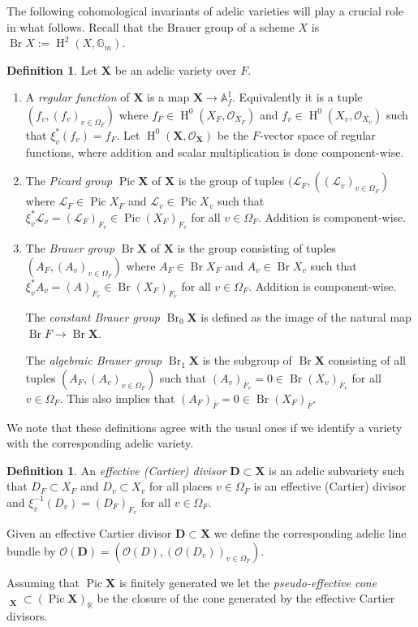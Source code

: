 \documentclass[a4paper,11pt,reqno]{amsart}
\newcommand{\R}{\mathbb{R}}
\newcommand{\G}{\mathbb{G}}
\newcommand{\A}{\mathbb{A}}
\DeclareMathOperator{\Pic}{Pic}
\DeclareMathOperator{\Eff}{\overline{Eff}}
\DeclareMathOperator{\Br}{Br}
\DeclareMathOperator{\HH}{H}
\theoremstyle{definition}
\newtheorem{definition}[theorem]{Definition}
\begin{document}
The following cohomological invariants of adelic varieties will play a crucial role in what follows. Recall \cite{Colliot2021Brauer} that the Brauer group of a scheme $X$ is $\Br X := \HH^2(X, \G_m)$.
\begin{definition}
	Let $\mathbf{X}$ be an adelic variety over $F$.
	\begin{enumerate}
		\item A \emph{regular function} of $\mathbf{X}$ is a map $\mathbf{X} \to \A^1_f$. Equivalently it is a tuple $(f_v, (f_v)_{v \in \Omega_{F}})$ where $f_F \in \HH^0(X_F, \mathcal{O}_{X_F})$ and $f_v \in \HH^0(X_v, \mathcal{O}_{X_v})$ such that $\xi_v^{*}(f_v) = f_F$. Let $\HH^0(\mathbf{X}, \mathcal{O}_{\mathbf{X}})$ be the $F$-vector space of regular functions, where addition and scalar multiplication is done component-wise.
		
		\item The \emph{Picard group} $\Pic \mathbf{X}$ of $\mathbf{X}$ is the group of tuples $(\mathcal{L}_F, ( (\mathcal{L}_v)_{v \in \Omega_F})$ where $\mathcal{L}_F \in \Pic X_F$ and $\mathcal{L}_v \in \Pic X_v$ such that $\xi_v^*\mathcal{L}_v = (\mathcal{L}_{F})_{F_v} \in \Pic (X_F)_{F_v}$ for all $v \in \Omega_F$. Addition is component-wise.

		\item The \emph{Brauer group} $\Br \mathbf{X}$ of $\mathbf{X}$ is the group consisting of tuples $(A_F, (A_v)_{v \in \Omega_F})$ where $A_F \in \Br X_F$ and $A_v \in \Br X_{v}$ such that $\xi_v^* A_v = (A)_{F_v} \in \Br (X_{F})_{F_v}$ for all $v \in \Omega_F$. Addition is component-wise.
		
		The \emph{constant Brauer group} $\Br_0 \mathbf{X}$ is defined as the image of the natural map $\Br F \to \Br \mathbf{X}$. 
		
		The \emph{algebraic Brauer group} $\Br_1 \mathbf{X}$ is the subgroup of $\Br \mathbf{X}$ consisting of all tuples $(A_F, (A_v)_{v \in \Omega_F})$ such that $(A_v)_{\overline{F}_v} = 0 \in \Br (X_v)_{\overline{F}_v}$ for all $v \in \Omega_F$. This also implies that $(A_F)_{\overline{F}} = 0 \in \Br (X_{F})_{\overline{F}}$.
	\end{enumerate}
\end{definition}

We note that these definitions agree with the usual ones if we identify a variety with the corresponding adelic variety.
\begin{definition}
	An \emph{effective (Cartier) divisor} $\mathbf{D} \subset \mathbf{X}$ is an adelic subvariety such that $D_F \subset X_F$ and $D_v \subset X_v$ for all places $v \in \Omega_{F}$ is an effective (Cartier) divisor and $\xi_v^{-1}(D_v) = (D_F)_{F_v}$ for all $v \in \Omega_F$.
	
	Given an effective Cartier divisor $\mathbf{D} \subset \mathbf{X}$ we define the corresponding adelic line bundle by $\mathcal{O}(\mathbf{D}) = (\mathcal{O}(D), (\mathcal{O}(D_v))_{v \in \Omega_F})$.
	
	Assuming that $\Pic \mathbf{X}$ is finitely generated we let the \emph{pseudo-effective cone} $\Eff_{\mathbf{X}} \subset (\Pic \mathbf{X})_{\R}$ be the closure of the cone generated by the effective Cartier divisors. 
\end{definition}
\end{document}
